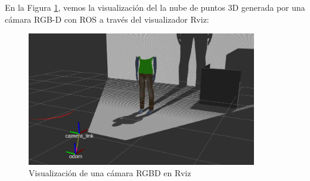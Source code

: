 En la Figura \ref{fig:camara_rviz}, vemos la visualización del la nube de puntos 3D generada por una cámara RGB-D con ROS a través del visualizador Rviz:\\

\begin{figure} [H]
  \begin{center}
    \includegraphics[width=10cm]{imagenes/cap3/camara-rviz.png}
  \end{center}
  \caption[Visualización de una cámara RGBD en Rviz]{Visualización de una cámara RGBD en Rviz}
  \label{fig:camara_rviz}
\end{figure}\


